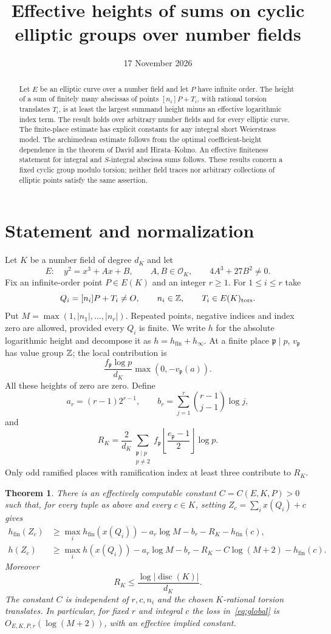 \documentclass[11pt,a4paper]{article}
\title{Effective heights of sums on cyclic elliptic groups over number fields}
\author{}\date{17 November 2026}
\newtheorem{theorem}{Theorem}[section]
\newcommand{\OK}{\mathcal O_K}
\newcommand{\hfin}{h_{\mathrm{fin}}}
\newcommand{\hinf}{h_{\infty}}
\begin{document}
\maketitle
\begin{abstract}
Let $E$ be an elliptic curve over a number field and let $P$ have
infinite order. The height of a sum of finitely many abscissas of
points $[n_i]P+T_i$, with rational torsion translates $T_i$, is at
least the largest summand height minus an effective logarithmic
index term. The result holds over arbitrary number fields and for
every elliptic curve. The finite-place estimate has explicit
constants for any integral short Weierstrass model. The
archimedean estimate follows from the optimal coefficient-height
dependence in the theorem of David and Hirata--Kohno.
An effective finiteness statement for integral and $S$-integral
abscissa sums follows. These results concern a fixed cyclic group
modulo torsion; neither field traces nor arbitrary collections of
elliptic points satisfy the same assertion.
\end{abstract}

\section{Statement and normalization}
Let $K$ be a number field of degree $d_K$ and let
\[
 E:\quad y^2=x^3+Ax+B,\qquad A,B\in\OK,\qquad 4A^3+27B^2\ne0.
\]
Fix an infinite-order point $P\in E(K)$ and an integer $r\ge1$.
For $1\le i\le r$ take
\[
 Q_i=[n_i]P+T_i\ne O,\qquad n_i\in\mathbb Z,\qquad T_i\in E(K)_{\rm tors}.
\]
Put $M=\max(1,|n_1|,\ldots,|n_r|)$. Repeated points, negative
indices and index zero are allowed, provided every $Q_i$ is finite.
We write $h$ for the absolute logarithmic height and decompose it
as $h=\hfin+\hinf$. At a finite place $\mathfrak p\mid p$,
$v_{\mathfrak p}$ has value group $\mathbb Z$; the local contribution is
\[
 \frac{f_{\mathfrak p}\log p}{d_K}
                    \max(0,-v_{\mathfrak p}(a)).
\]
All these heights of zero are zero. Define
\[
 a_r=(r-1)2^{r-1},\qquad
 b_r=\sum_{j=1}^r\binom{r-1}{j-1}\log j,
\]
and
\[
 R_K=\frac{2}{d_K}
 \sum_{\substack{\mathfrak p\mid p\\p\ne2}}
 f_{\mathfrak p}\left\lfloor\frac{e_{\mathfrak p}-1}{2}\right\rfloor\log p.
\]
Only odd ramified places with ramification index at least three
contribute to $R_K$.

\begin{theorem}\label{thm:main}
There is an effectively computable constant $C=C(E,K,P)>0$ such
that, for every tuple as above and every $c\in K$, setting
$Z_c=\sum_i x(Q_i)+c$ gives
\begin{align}
 \hfin(Z_c)&\ge\max_i\hfin(x(Q_i))
       -a_r\log M-b_r-R_K-\hfin(c),\label{eq:finite}\\
 h(Z_c)&\ge\max_i h(x(Q_i))
       -a_r\log M-b_r-R_K-C\log(M+2)-\hfin(c).
       \label{eq:global}
\end{align}
Moreover
\[
 R_K\le\frac{\log|\operatorname{disc}(K)|}{d_K}.
\]
The constant $C$ is independent of $r,c,n_i$ and the chosen
$K$-rational torsion translates. In particular, for fixed $r$
and integral $c$ the loss in~\eqref{eq:global} is $O_{E,K,P,r}(\log(M+2))$,
with an effective implied constant.
\end{theorem}
\end{document}
